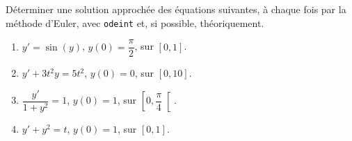  
\question{} Déterminer une solution approchée des équations suivantes, à chaque fois par la méthode d'Euler, avec \texttt{odeint} et, si possible, théoriquement.
  \begin{enumerate}
    \item $y' = \sin(y)$, $y(0) = \dfrac{\pi}{2}$, sur $[0,1]$.
    \item $y' + 3t^2 y = 5t^2$, $y(0) = 0$, sur $[0,10]$.
    \item $\dfrac{y'}{1+y^2} = 1$, $y(0) = 1$, sur $\left[0,\dfrac{\pi}{4} \right[$.
    \item $y'+y^2=t$, $y(0) = 1$, sur $[0,1]$.
  \end{enumerate}